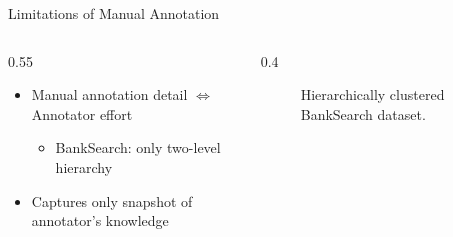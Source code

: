 \begin{frame}{Limitations of Manual Annotation}
\begin{columns}[c,onlytextwidth]
\begin{column}{0.55\textwidth}


\begin{itemize}
    \item Manual annotation detail $\Leftrightarrow$ Annotator effort
    \begin{itemize}
        \item<2-> BankSearch: only two-level hierarchy 
    \end{itemize}
    \item<3-> Captures only snapshot of annotator's knowledge
\end{itemize}


\end{column}

\begin{column}{0.4\textwidth}
\begin{figure}[htbp]
  \centering
  
  \caption{Hierarchically clustered BankSearch dataset.}
\end{figure}
\end{column}
\end{columns}

\end{frame}



